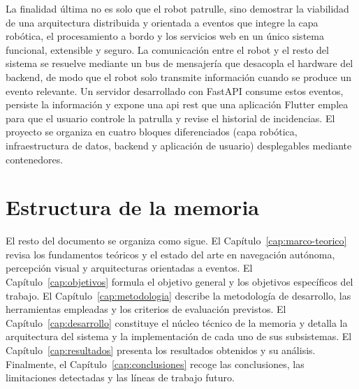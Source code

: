 La finalidad última no es solo que el robot patrulle, sino demostrar la viabilidad
de una arquitectura distribuida y orientada a eventos que integre la capa
robótica, el procesamiento a bordo y los servicios web en un único sistema
funcional, extensible y seguro. La comunicación entre el robot y el resto del
sistema se resuelve mediante un bus de mensajería \parencite{kreps2011kafka} que
desacopla el hardware del backend, de modo que el robot solo transmite
información cuando se produce un evento relevante. Un servidor
desarrollado con FastAPI consume estos eventos, persiste la información y expone
una \gls{api} \gls{rest} que una aplicación \mbox{Flutter} emplea para que el
usuario controle la patrulla y revise el historial de incidencias. El proyecto se
organiza en cuatro bloques diferenciados (capa robótica,
infraestructura de datos, backend y aplicación de usuario) desplegables mediante
contenedores.

\section{Estructura de la memoria}
\label{sec:estructura-memoria}

El resto del documento se organiza como sigue. El
Capítulo~\ref{cap:marco-teorico} revisa los fundamentos teóricos y el estado del
arte en navegación autónoma, percepción visual y arquitecturas orientadas a
eventos. El Capítulo~\ref{cap:objetivos} formula el objetivo general y los
objetivos específicos del trabajo. El Capítulo~\ref{cap:metodologia} describe la
metodología de desarrollo, las herramientas empleadas y los criterios de
evaluación previstos. El Capítulo~\ref{cap:desarrollo} constituye el núcleo
técnico de la memoria y detalla la arquitectura del sistema y la implementación
de cada uno de sus subsistemas. El Capítulo~\ref{cap:resultados} presenta los
resultados obtenidos y su análisis. Finalmente, el
Capítulo~\ref{cap:conclusiones} recoge las conclusiones, las limitaciones
detectadas y las líneas de trabajo futuro.

